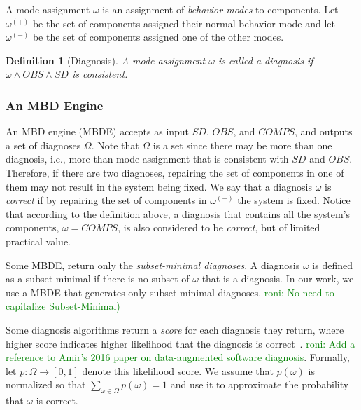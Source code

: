 \documentclass[review]{elsarticle}
\newcommand\roni[1]{\textcolor{green}{roni: #1}}
\newtheorem{definition}{Definition}
\newcommand{\COMPS}{\textit{COMPS}}
\newcommand{\SD}{\textit{SD}}
\newcommand{\OBS}{\textit{OBS}}
\begin{document}
A mode assignment $\omega$ is an assignment of {\em behavior modes} to components. Let $\omega^{(+)}$ be the set of components assigned their normal behavior mode and let $\omega^{(-)}$ be the set of components assigned one of the other modes.

\begin{definition}[Diagnosis]
A mode assignment $\omega$ is called a diagnosis if $\omega \wedge \OBS \wedge \SD$ is consistent.
\end{definition}

\subsubsection{An MBD Engine}


An MBD engine (MBDE) accepts as input $\SD$, $\OBS$, and $\COMPS$, and outputs a set of diagnoses $\Omega$. Note that $\Omega$ is a set since there may be more than one diagnosis, i.e., more than mode assignment that is consistent with $\SD$ and $\OBS$. 
Therefore, if there are two diagnoses, repairing the set of components in one of them may not result in the system being fixed. We say that a diagnosis $\omega$ is {\em correct} if by repairing the set of components in $\omega^{(-)}$ the system is fixed. 
Notice that according to the definition above, a diagnosis that contains all the system's components, $\omega = \COMPS$, is also considered to be {\em correct}, but of limited practical value. 

Some MBDE, return only the \emph{subset-minimal diagnoses}. A diagnosis $\omega$ is defined as a subset-minimal if there is no subset of $\omega$ that is a diagnosis. 
In our work, we use a MBDE that generates only subset-minimal diagnoses.
\roni{No need to capitalize Subset-Minimal)}

Some diagnosis algorithms return a \emph{score} for each diagnosis they return, where higher score indicates higher likelihood that the diagnosis is correct~\cite{williams2007conflict,abreu2011simultaneousDebugging}. \roni{Add a reference to Amir's 2016 paper on data-augmented software diagnosis}. Formally, let $p: \Omega \rightarrow [0,1]$ denote this likelihood score. We assume that $p(\omega)$ is normalized so that $\sum_{\omega\in\Omega} p(\omega)=1$ and use it to approximate the probability that $\omega$ is correct.
\end{document}
